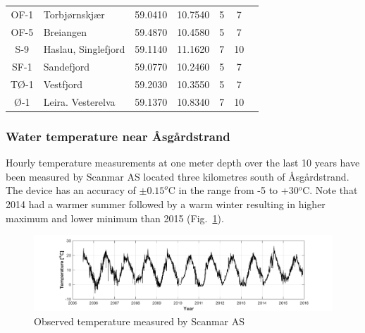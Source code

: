 \begin{table}
\begin{tabular}{|clcccc@{}c|}
OF-1 & Torbj{\o}rnskj{\ae}r & 59.0410 & 10.7540 & 5 & 7 &\\ 
OF-5 & Breiangen & 59.4870 & 10.4580 & 5 & 7 &\\ \hline
S-9  & Haslau, Singlefjord & 59.1140 & 11.1620 & 7 & 10 &\\ 
SF-1 & Sandefjord & 59.0770 & 10.2460 & 5 & 7 &\\ \hline
T{\O}-1 & Vestfjord & 59.2030 & 10.3550 & 5 & 7 &\\ 
{\O}-1 & Leira. Vesterelva & 59.1370 & 10.8340 & 7 & 10 &\\ \hline
\end{tabular}
\end{table}




\subsubsection{Water temperature near {\AA}sg{\aa}rdstrand}

Hourly temperature measurements at one meter depth over the last 10 years have been measured by Scanmar AS located three kilometres south of {\AA}sg{\aa}rdstrand. The device has an accuracy of $\pm 0.15^o$C in the range from -5 to +30$^o$C. Note that 2014 had a warmer summer followed by a warm winter resulting in higher maximum and lower minimum than 2015 (Fig.~\ref{fig:Scan_temp}). 

\begin{figure}[htb]
\centerline{
\includegraphics*[trim=2cm 0cm 2cm 0cm,clip=true,width=\textwidth]{Figurer/temp_Scanmar}}
\caption{\small
Observed temperature measured by Scanmar AS}
\label{fig:Scan_temp}
\end{figure}

